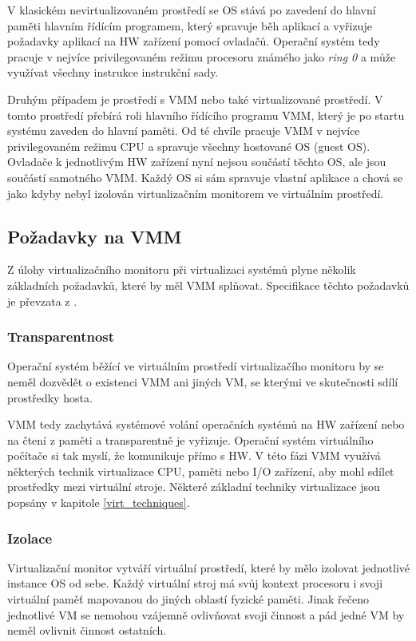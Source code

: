 V klasickém nevirtualizovaném prostředí se OS stává po zavedení do hlavní paměti hlavním řídícím programem, který spravuje běh aplikací a vyřizuje požadavky aplikací na HW zařízení pomocí ovladačů. Operační systém tedy pracuje
v nejvíce privilegovaném režimu procesoru známého jako \textit{ring 0} a může využívat všechny instrukce instrukční sady.

Druhým případem je prostředí s VMM nebo také virtualizované prostředí. V tomto prostředí přebírá roli hlavního řídícího programu VMM, který je po startu systému zaveden do hlavní paměti. Od té chvíle pracuje VMM v nejvíce privilegovaném
režimu CPU a spravuje všechny hostované OS (guest OS). Ovladače k jednotlivým HW zařízení nyní nejsou součástí těchto OS, ale jsou součástí samotného VMM. Každý OS si sám spravuje vlastní aplikace a chová se jako kdyby nebyl izolován virtualizačním monitorem
ve virtuálním prostředí.\cite{vmm1}

\subsection{Požadavky na VMM}

Z úlohy virtualizačního monitoru při virtualizaci systémů plyne několik základních požadavků, které by měl VMM splňovat. Specifikace těchto požadavků je převzata z \cite{virt2}.

\subsubsection*{Transparentnost}

Operační systém běžící ve virtuálním prostředí virtualizačího monitoru by se neměl dozvědět o existenci VMM ani jiných VM, se kterými ve skutečnosti sdílí prostředky hosta.

VMM tedy zachytává systémové volání operačních systémů na HW zařízení nebo na čtení z paměti a transparentně je vyřizuje. Operační systém virtuálního počítače si tak myslí, že komunikuje přímo s HW. V této fázi VMM využívá 
některých technik virtualizace CPU, paměti nebo I/O zařízení, aby mohl sdílet prostředky mezi virtuální stroje. Některé základní techniky virtualizace jsou popsány v kapitole \ref{virt_techniques}.

\subsubsection*{Izolace}

Virtualizační monitor vytváří virtuální prostředí, které by mělo izolovat jednotlivé instance OS od sebe. Každý virtuální stroj má svůj kontext procesoru i svoji virtuální paměť mapovanou do jiných oblastí fyzické paměti.
Jinak řečeno jednotlivé VM se nemohou vzájemně ovlivňovat svoji činnost a pád jedné VM by neměl ovlivnit činnost ostatních.


